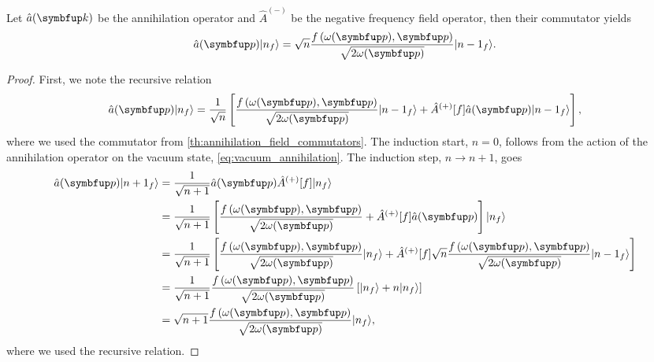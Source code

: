 \begin{lemma}\label{th:number_annihilation}
	Let $\hat{a}(\vb{k})$ be the annihilation operator and $\hat{A}^{(-)}$ be the negative frequency field operator, then their commutator yields
	\begin{equation}
		\hat{a}(\vb{p})
		\ket{n_f}
		=
		\sqrt{n}
		\frac{f\left(\omega(\vb{p}),\vb{p}\right)}{\sqrt{2\omega(\vb{p})}}
		\ket{{n-1}_f}
		\label{eq:number_annihilation}
		.
	\end{equation}
\end{lemma}
\begin{proof}
	First, we note the recursive relation
	\begin{equation}
		\hat{a}(\vb{p})
		\ket{n_f}
		=
		\frac{1}{\sqrt{n}}
		\left[
			\frac{f\left(\omega(\vb{p}),\vb{p}\right)}{\sqrt{2\omega(\vb{p})}}
			\ket{{n-1}_f}
			+
			\hat{A}^{(+)}[f]
			\hat{a}(\vb{p})
			\ket{{n-1}_f}
		\right]
		,
	\end{equation}
	where we used the commutator from \cref{th:annihilation_field_commutators}.
	The induction start, $n=0$, follows from the action of the annihilation operator on the vacuum state, \cref{eq:vacuum_annihilation}.
	The induction step, $n\to n+1$, goes
	\begin{equation}
		\begin{split}
			\hat{a}(\vb{p})
			\ket{{n+1}_f}
			&=
			\frac{1}{\sqrt{n+1}}
			\hat{a}(\vb{p})
			\hat{A}^{(+)}[f]
			\ket{n_f}
			\\
			&=
			\frac{1}{\sqrt{n+1}}
			\left[
				\frac{f\left(\omega(\vb{p}),\vb{p}\right)}{\sqrt{2\omega(\vb{p})}}
				+
				\hat{A}^{(+)}[f]
				\hat{a}(\vb{p})
			\right]
			\ket{n_f}
			\\
			&=
			\frac{1}{\sqrt{n+1}}
			\left[
				\frac{f\left(\omega(\vb{p}),\vb{p}\right)}{\sqrt{2\omega(\vb{p})}}
				\ket{n_f}
				+
				\hat{A}^{(+)}[f]
				\sqrt{n}
				\frac{f\left(\omega(\vb{p}),\vb{p}\right)}{\sqrt{2\omega(\vb{p})}}
				\ket{{n-1}_f}
			\right]
			\\
			&=
			\frac{1}{\sqrt{n+1}}
			\frac{f\left(\omega(\vb{p}),\vb{p}\right)}{\sqrt{2\omega(\vb{p})}}
			\left[
				\ket{n_f}
				+
				n
				\ket{n_f}
			\right]
			\\
			&=
			\sqrt{n+1}
			\frac{f\left(\omega(\vb{p}),\vb{p}\right)}{\sqrt{2\omega(\vb{p})}}
			\ket{n_f}
			,
		\end{split}
	\end{equation}
	where we used the recursive relation.
\end{proof}

